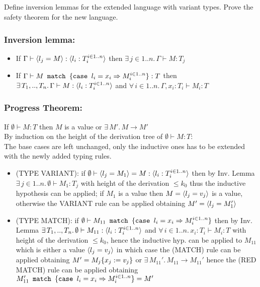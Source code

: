 \subsection{}

Define inversion lemmas for the extended language with variant
types. Prove the safety theorem for the new language.

\subsubsection*{Inversion lemma:}

\begin{itemize}
\item If \(\Gamma \vdash \langle l_j = M \rangle: \langle l_i: T_i^{i \in 1..n} \rangle\)
  then \(\exists\, j \in 1..n.\, \Gamma \vdash M: T_j\)
\item If \(\Gamma \vdash M\texttt{ match }\{\texttt{case }l_i = x_i \Rightarrow M_i^{i \in 1..n}\}:
  T\) then \(\exists\, T_1,..,T_n.\, \Gamma \vdash M: \langle l_i:
    T_i^{i \in 1..n} \rangle\) and \(\forall\, i \in 1..n.\, \Gamma, x_i: T_i
  \vdash M_i: T\)
\end{itemize}


\subsubsection*{Progress Theorem:}

If \(\emptyset \vdash M: T\) then \(M\) is a value or \(\exists\,
M'.\, M \to M'\)\\ By induction on the height of the derivation tree
of \(\emptyset \vdash M: T\):\\ The base cases are left unchanged,
only the inductive ones has to be extended with the newly added typing
rules.
\begin{itemize}
\item (TYPE VARIANT): if \(\emptyset \vdash \langle l_j = M_1 \rangle = M:
  \langle l_i:T_i^{i \in 1..n} \rangle\) then by Inv. Lemma \(\exists\, j \in
  1..n.\, \emptyset \vdash M_1: T_j\) with height of the derivation
  \(\le k_0\) thus the inductive hypothesis can be applied; if \(M_1\)
  is a value then \(M = \langle l_j = v_j \rangle\) is a value, otherwise the
  VARIANT rule can be applied obtaining \(M' = \langle l_j = M_1' \rangle\)
\item (TYPE MATCH): if \(\emptyset \vdash
  M_{11}\texttt{ match }\{\texttt{case }l_i = x_i \Rightarrow M_i^{i \in 1..n}\}\) then by
  Inv. Lemma \(\exists\, T_1,..,T_n.\, \emptyset \vdash M_{11}:
  \langle l_i: T_i^{i \in 1..n} \rangle\) and \(\forall\, i \in 1..n.\, x_i:
  T_i \vdash M_i: T\) with height of the derivation \(\le k_0\), hence
  the inductive hyp. can be applied to \(M_{11}\) which is either a
  value \(\langle l_j = v_j \rangle\) in which case the (MATCH) rule can be
  applied obtaining \(M' = M_j\{x_j:=v_j\}\) or \(\exists\,
  M_{11}'.\, M_{11} \to M_{11}'\) hence the (RED MATCH) rule can be
  applied obtaining \(M_{11}'\texttt{ match }\{\texttt{case }l_i = x_i \Rightarrow M_i^{i \in
        1..n}\} = M'\)
\end{itemize}


